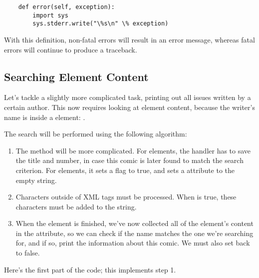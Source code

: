 \documentclass{howto}
\newcommand{\element}[1]{\code{#1}}
\begin{document}
\begin{verbatim}
    def error(self, exception):
        import sys
        sys.stderr.write("\%s\n" \% exception)
\end{verbatim}

With this definition, non-fatal errors will result in an error message,
whereas fatal errors will continue to produce a traceback.

\subsection{Searching Element Content}

Let's tackle a slightly more complicated task, printing out all issues
written by a certain author.  This now requires looking at element
content, because the writer's name is inside a \element{writer}
element: .

The search will be performed using the following algorithm:

\begin{enumerate}
\item 
The  method will be more complicated.  For
\element{comic} elements, the handler has to save the title and
number, in case this comic is later found to match the search
criterion.  For \element{writer} elements, it sets a
 flag to true, and sets a 
attribute to the empty string.

\item Characters outside of XML tags must be processed.  When
 is true, these characters must be added to the
 string.

\item When the \element{writer} element is finished, we've now
collected all of the element's content in the 
attribute, so we can check if the name matches the one we're searching 
for, and if so, print the information about this comic.  We must also
set  back to false.
\end{enumerate}

Here's the first part of the code; this implements step 1.
\end{document}
